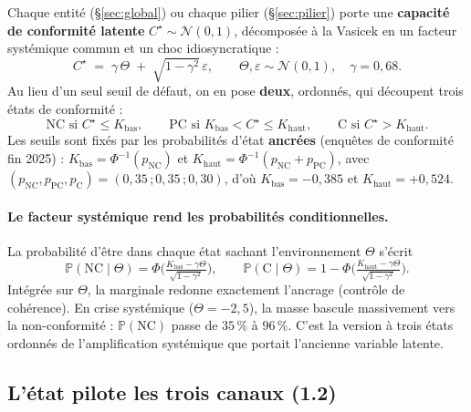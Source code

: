 \documentclass[11pt,a4paper]{article}
\begin{document}
Chaque entité (\S\ref{sec:global}) ou chaque pilier (\S\ref{sec:pilier}) porte une
\textbf{capacité de conformité latente} $C^\star\sim\mathcal N(0,1)$, décomposée à la Vasicek
en un facteur systémique commun et un choc idiosyncratique :
\begin{equation}
C^\star \;=\; \gamma\,\Theta \;+\; \sqrt{1-\gamma^2}\,\varepsilon,
\qquad \Theta,\varepsilon\sim\mathcal N(0,1),\quad \gamma=0{,}68.
\end{equation}
Au lieu d'un seul seuil de défaut, on en pose \textbf{deux}, ordonnés, qui découpent trois
états de conformité :
\begin{equation}
\text{NC si } C^\star\le K_{\text{bas}}, \qquad
\text{PC si } K_{\text{bas}}<C^\star\le K_{\text{haut}}, \qquad
\text{C si } C^\star>K_{\text{haut}}.
\end{equation}
Les seuils sont fixés par les probabilités d'état \textbf{ancrées} (enquêtes de conformité
fin 2025) : $K_{\text{bas}}=\Phi^{-1}(p_{\text{NC}})$ et
$K_{\text{haut}}=\Phi^{-1}(p_{\text{NC}}+p_{\text{PC}})$, avec
$(p_{\text{NC}},p_{\text{PC}},p_{\text{C}})=(0{,}35\,;0{,}35\,;0{,}30)$, d'où
$K_{\text{bas}}=-0{,}385$ et $K_{\text{haut}}=+0{,}524$.

\paragraph{Le facteur systémique rend les probabilités conditionnelles.} La probabilité
d'être dans chaque état sachant l'environnement $\Theta$ s'écrit
\begin{equation}
\mathbb P(\text{NC}\mid\Theta)=\Phi\!\Big(\tfrac{K_{\text{bas}}-\gamma\Theta}{\sqrt{1-\gamma^2}}\Big),
\qquad
\mathbb P(\text{C}\mid\Theta)=1-\Phi\!\Big(\tfrac{K_{\text{haut}}-\gamma\Theta}{\sqrt{1-\gamma^2}}\Big).
\end{equation}
Intégrée sur $\Theta$, la marginale redonne exactement l'ancrage (contrôle de cohérence). En
crise systémique ($\Theta=-2{,}5$), la masse bascule massivement vers la non-conformité :
$\mathbb P(\text{NC})$ passe de $35\,\%$ à $96\,\%$. C'est la version à trois états ordonnés de
l'amplification systémique que portait l'ancienne variable latente.

\subsection{L'état pilote les trois canaux (1.2)}
\end{document}
